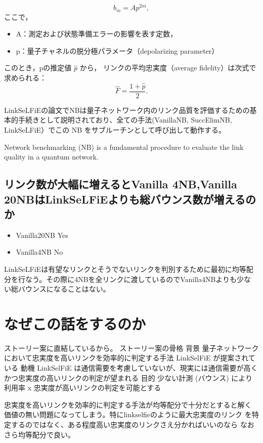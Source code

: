 \documentclass[conference]{IEEEtran}
\begin{document}
\[
b_m = A p^{2m},
\]
ここで，

\begin{itemize}
\item A：測定および状態準備エラーの影響を表す定数，
\item p：量子チャネルの脱分極パラメータ（depolarizing parameter）
\end{itemize}


このとき，pの推定値 \(\hat{p}\) から，
リンクの平均忠実度（average fidelity）は次式で求められる：
\[
\hat{F} = \frac{1 + \hat{p}}{2}.
\]

LinkSeLFiEの論文でNBは量子ネットワーク内のリンク品質を評価するための基
本的手続きとして説明されており、全ての手法(VanillaNB, SuccElimNB,
LinkSeLFiE）でこの NB をサブルーチンとして呼び出して動作する。

Network benchmarking (NB) is a fundamental procedure to evaluate the link quality in a quantum network.


\subsection{リンク数が大幅に増えるとVanilla 4NB,Vanilla 20NBはLinkSeLFiEよりも総バウンス数が増えるのか}
\label{sec:org0656240}
\begin{itemize}
\item Vanilla20NB Yes
\item Vanilla4NB No
\end{itemize}

LinkSeLFiEは有望なリンクとそうでないリンクを判別するために最初に均等配
分を行なう。その際に4NBを全リンクに渡しているのでVanilla4NBよりも少な
い総バウンスになることはない。

\section{なぜこの話をするのか}
\label{sec:org7d5d4e1}
ストーリー案に直結しているから。
ストーリー案の骨格
背景 量子ネットワークにおいて忠実度を高いリンクを効率的に判定する手法 LinkSelFiE が提案されている
動機 LinkSelFiE は通信需要を考慮していないが、現実には通信需要が高くかつ忠実度の高いリンクの判定が望まれる
目的 少ない計測 (バウンス) により利用率 x 忠実度が高いリンクの判定を可能とする

忠実度を高いリンクを効率的に判定する手法が均等配分で十分だとすると解く
価値の無い問題になってしまう。特にlinkselfieのように最大忠実度のリンク
を特定するのではなく、ある程度高い忠実度のリンクさえ分かればいいのなら
なおさら均等配分で良い。
\end{document}
